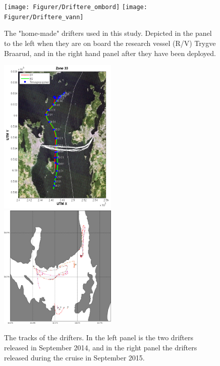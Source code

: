 \begin{figure}[ht]
\centerline{
\texttt{[image: Figurer/Driftere\_ombord]}
\texttt{[image: Figurer/Driftere\_vann]}
}
\caption{\small
The "home-made" drifters used in this study. Depicted in the panel to the left when they are on board the research vessel (R/V) Trygve Braarud, and in the right hand panel after they have been deployed.}
\label{fig:drifters_design}
\end{figure}

\begin{figure}[ht]
\centerline{
\includegraphics*[width=0.5\textwidth]{Figurer/drifters_sept2014}
\includegraphics*[width=0.5\textwidth]{Figurer/drifters_low_crop}
}
\caption{\small
The tracks of the drifters. In the left panel is the two drifters released in September 2014, and in the right panel the drifters released during the cruise in September 2015.}
\label{fig:drifters_tracks}
\end{figure}

\newpage
\clearpage
